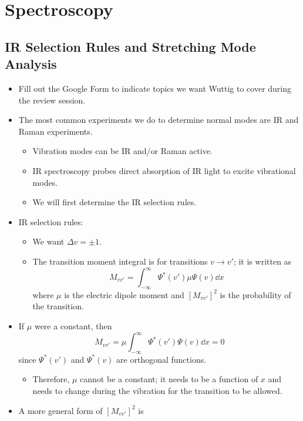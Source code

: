\documentclass[../notes.tex]{subfiles}
\begin{document}
\chapter{Spectroscopy}
\section{IR Selection Rules and Stretching Mode Analysis}
\begin{itemize}
    \item {}Fill out the Google Form to indicate topics we want Wuttig to cover during the review session.
    \item The most common experiments we do to determine normal modes are IR and Raman experiments.
    \begin{itemize}
        \item Vibration modes can be IR and/or Raman active.
        \item IR spectroscopy probes direct absorption of IR light to excite vibrational modes.
        \item We will first determine the IR selection rules.
    \end{itemize}
    \item IR selection rules:
    \begin{itemize}
        \item We want $\Delta v=\pm 1$.
        \item The transition moment integral is for transitions $v\to v'$; it is written as
        \begin{equation*}
            M_{vv'} = \int_{-\infty}^\infty\Psi^*(v')\mu\Psi(v)\dd{x}
        \end{equation*}
        where $\mu$ is the electric dipole moment and $[M_{vv'}]^2$ is the probability of the transition.
    \end{itemize}
    \item If $\mu$ were a constant, then
    \begin{equation*}
        M_{vv'} = \mu\int_{-\infty}^\infty\Psi^*(v')\Psi(v)\dd{x} = 0
    \end{equation*}
    since $\Psi^*(v')$ and $\Psi^*(v)$ are orthogonal functions.
    \begin{itemize}
        \item Therefore, $\mu$ cannot be a constant; it needs to be a function of $x$ and needs to change during the vibration for the transition to be allowed.
    \end{itemize}
    \item A more general form of $[M_{vv'}]^2$ is

\end{itemize}
\end{document}
